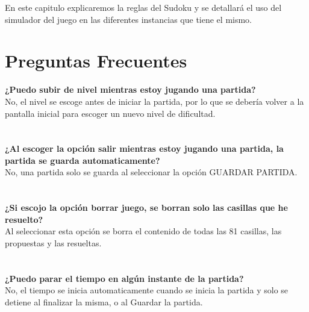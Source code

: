 \documentclass[12pt,oneside]{book}
\begin{document}
En este capitulo explicaremos la reglas del Sudoku y se detallar\'a el uso del simulador del juego en las diferentes instancias que tiene el mismo. 






\chapter{Preguntas Frecuentes}

\begin{center}

\textbf{¿Puedo subir de nivel mientras estoy jugando una partida?} \\ No, el nivel se escoge antes de iniciar la partida, por lo que se debería volver a la pantalla inicial para escoger un nuevo nivel de dificultad.
\ \\ \ \\ \ \\

\textbf{¿Al escoger la opción salir mientras estoy jugando una partida, la partida se guarda automaticamente?} \\ No, una partida solo se guarda al seleccionar la opción GUARDAR PARTIDA.
\ \\ \ \\ \ \\

\textbf{¿Si escojo la opción borrar juego, se borran solo las casillas que he resuelto?} \\ Al seleccionar esta opción se borra el contenido de todas las 81 casillas, las propuestas y las resueltas.
\ \\ \ \\ \ \\

\textbf{¿Puedo parar el tiempo en algún instante de la partida?} \\ No, el tiempo se inicia automaticamente cuando se inicia la partida y solo se detiene al finalizar la misma, o al Guardar la partida.


\end{center}
\end{document}
